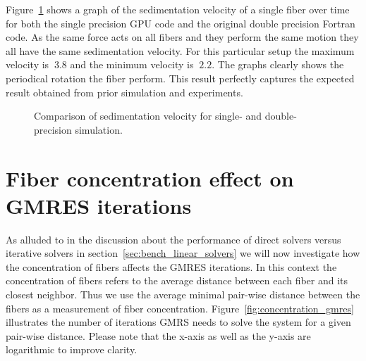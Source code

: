 \documentclass[a4paper,11pt]{kth-mag}
\begin{document}
Figure~\ref{fig:ring_sedimentation_velocity} shows a graph of the sedimentation velocity of a single fiber over time for both the single precision GPU code and the original double precision Fortran code. As the same force acts on all fibers and they perform the same motion they all have the same sedimentation velocity. For this particular setup the maximum velocity is $~3.8$ and the minimum velocity is $~2.2$. The graphs clearly shows the periodical rotation the fiber perform. This result perfectly captures the expected result obtained from prior simulation and experiments.

\begin{figure}[!htbp]
  \centering
  \caption{Comparison of sedimentation velocity for single- and double-precision simulation.}
  \label{fig:ring_sedimentation_velocity}
\end{figure}

\section{Fiber concentration effect on GMRES iterations}
\label{sec:example_concentration_gmres}

As alluded to in the discussion about the performance of direct solvers versus iterative solvers in section~\ref{sec:bench_linear_solvers} we will now investigate how the concentration of fibers affects the GMRES iterations. In this context the concentration of fibers refers to the average distance between each fiber and its closest neighbor. Thus we use the average minimal pair-wise distance between the fibers as a measurement of fiber concentration. Figure~\ref{fig:concentration_gmres} illustrates the number of iterations GMRS needs to solve the system for a given pair-wise distance. Please note that the x-axis as well as the y-axis are logarithmic to improve clarity.
\end{document}
